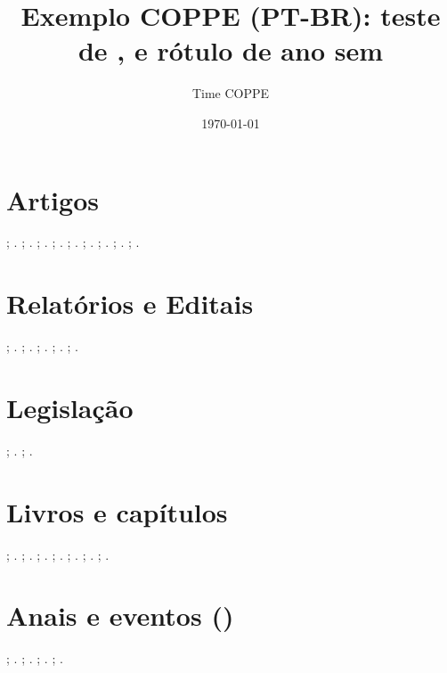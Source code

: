 \documentclass[a4paper,12pt]{article}
\title{Exemplo COPPE (PT-BR): teste de \string\printurldate, \string\printeventdate e rótulo de ano sem \string\urldate}
\author{Time COPPE}
\date{\today}
\begin{document}
\maketitle
\section*{Artigos}
\citet{art-1-complete-doi}; \citep{art-1-complete-doi}.
\citet{art-2-missing-doi-has-url}; \citep{art-2-missing-doi-has-url}.
\citet{art-3-missing-author}; \citep{art-3-missing-author}.
\citet{mag-1-complete}; \citep{mag-1-complete}.
\citet{mag-2-missing-url}; \citep{mag-2-missing-url}.
\citet{news-1-complete}; \citep{news-1-complete}.
\citet{news-2-missing-pages}; \citep{news-2-missing-pages}.
\citet{dou-1-complete}; \citep{dou-1-complete}.
\citet{dou-2-missing-dousection}; \citep{dou-2-missing-dousection}.


\section*{Relatórios e Editais}
\citet{rep-1-generic-complete}; \citep{rep-1-generic-complete}.
\citet{rep-2-generic-missing-org}; \citep{rep-2-generic-missing-org}.
\citet{edital-1-complete}; \citep{edital-1-complete}.
\citet{edital-2-missing-modalidade}; \citep{edital-2-missing-modalidade}.
\citet{edital-3-missing-objeto}; \citep{edital-3-missing-objeto}.

\section*{Legislação}
\citet{leg-1-complete}; \citep{leg-1-complete}.
\citet{leg-2-missing-ementa}; \citep{leg-2-missing-ementa}.


\section*{Livros e capítulos}
\citet{book-1-complete}; \citep{book-1-complete}.
\citet{book-2-missing-author-has-editor}; \citep{book-2-missing-author-has-editor}.
\citet{book-3-missing-publisher-location}; \citep{book-3-missing-publisher-location}.
\citet{incoll-1-complete}; \citep{incoll-1-complete}.
\citet{incoll-2-missing-editor}; \citep{incoll-2-missing-editor}.
\citet{inbook-1-complete}; \citep{inbook-1-complete}.
\citet{inbook-2-missing-edition}; \citep{inbook-2-missing-edition}.
\section*{Anais e eventos (\string\printeventdate)}
\citet{inproc-1-complete}; \citep{inproc-1-complete}.
\citet{inproc-2-missing-event}; \citep{inproc-2-missing-event}.
\citet{proc-1-complete}; \citep{proc-1-complete}.
\citet{proc-2-missing-event}; \citep{proc-2-missing-event}.
\end{document}
